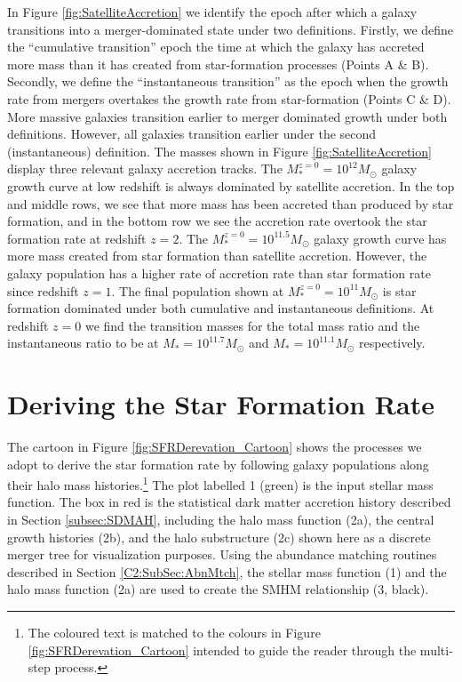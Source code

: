 In Figure \ref{fig:SatelliteAccretion} we identify the epoch after which a galaxy transitions into a merger-dominated state under two definitions. Firstly, we define the ``cumulative transition'' epoch the time at which the galaxy has accreted more mass than it has created from star-formation processes (Points A \& B). Secondly, we define the ``instantaneous transition'' as the epoch when the growth rate from mergers overtakes the growth rate from star-formation (Points C \& D). More massive galaxies transition earlier to merger dominated growth under both definitions. However, all galaxies transition earlier under the second (instantaneous) definition. The masses shown in Figure \ref{fig:SatelliteAccretion} display three relevant galaxy accretion tracks. The $M^{z=0}_* = 10^{12} M_{\odot}$ galaxy growth curve at low redshift is always dominated by satellite accretion. In the top and middle rows, we see that more mass has been accreted than produced by star formation, and in the bottom row we see the accretion rate overtook the star formation rate at redshift $z=2$. The $M^{z=0}_* = 10^{11.5} M_{\odot}$ galaxy growth curve has more mass created from star formation than satellite accretion. However, the galaxy population has a higher rate of accretion rate than star formation rate since redshift $z = 1$. The final population shown at $M^{z=0}_* = 10^{11} M_{\odot}$ is star formation dominated under both cumulative and instantaneous definitions. At redshift $z = 0$ we find the transition masses for the total mass ratio and the instantaneous ratio to be at $M_* = 10^{11.7} M_{\odot}$ and $M_* = 10^{11.1} M_{\odot}$ respectively.

\section{Deriving the Star Formation Rate}
\label{sec:SFR_Dev}

The cartoon in Figure \ref{fig:SFRDerevation_Cartoon} shows the processes we adopt to derive the star formation rate by following galaxy populations along their halo mass histories.\footnote{The coloured text is matched to the colours in Figure \ref{fig:SFRDerevation_Cartoon} intended to guide the reader through the multi-step process.} \textcolor{MPLgreen}{The plot labelled 1 (green) is the input stellar mass function.} \textcolor{MPLred}{The box in red is the statistical dark matter accretion history described in Section \ref{subsec:SDMAH}, including the halo mass function (2a), the central growth histories (2b), and the halo substructure (2c) shown here as a discrete merger tree for visualization purposes.} Using the abundance matching routines described in Section \ref{C2:SubSec:AbnMtch}, the \textcolor{MPLgreen}{stellar mass function (1)} and the \textcolor{MPLred}{halo mass function (2a)} are used to create the SMHM relationship (3, black).


